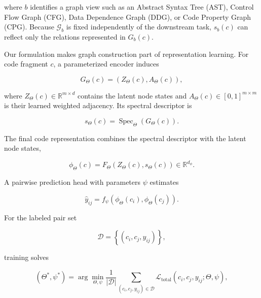 \documentclass[authoryear,final,5p,times,twocolumn]{elsarticle}
\theoremstyle{plain}
\begin{document}
where $b$ identifies a graph view such as an Abstract Syntax Tree (AST),
Control Flow Graph (CFG), Data Dependence Graph (DDG), or Code Property Graph
(CPG). Because $\mathcal{G}_{b}$ is fixed independently of the downstream
task, $s_b(c)$ can reflect only the relations represented in $G_b(c)$.

Our formulation makes graph construction part of representation learning.
For code fragment $c$, a parameterized encoder induces

\begin{equation}
\label{eq:learned_graph}
G_{\Theta}(c)
=
\left(
    Z_{\Theta}(c),
    A_{\Theta}(c)
\right),
\end{equation}

where $Z_{\Theta}(c)\in\mathbb{R}^{m\times d}$ contains the latent node states
and $A_{\Theta}(c)\in[0,1]^{m\times m}$ is their learned weighted adjacency.
Its spectral descriptor is

\begin{equation}
\label{eq:learned_spectrum}
s_{\Theta}(c)
=
\operatorname{Spec}_{\Theta}
\left(
    G_{\Theta}(c)
\right).
\end{equation}

The final code representation combines the spectral descriptor with the
latent node states,

\begin{equation}
\label{eq:learned_mapping}
\phi_{\Theta}(c)
=
F_{\Theta}
\left(
    Z_{\Theta}(c),
    s_{\Theta}(c)
\right)
\in
\mathbb{R}^{d_{\phi}}.
\end{equation}

A pairwise prediction head with parameters $\psi$ estimates

\begin{equation}
\label{eq:clone_probability_general}
\hat{y}_{ij}
=
f_{\psi}
\left(
    \phi_{\Theta}(c_i),
    \phi_{\Theta}(c_j)
\right).
\end{equation}

For the labeled pair set

\begin{equation}
\mathcal{D}
=
\left\{
    (c_i,c_j,y_{ij})
\right\},
\end{equation}

training solves

\begin{equation}
\label{eq:central_objective}
(\Theta^{*},\psi^{*})
=
\arg\min_{\Theta,\psi}
\frac{1}{|\mathcal{D}|}
\sum_{(c_i,c_j,y_{ij})\in\mathcal{D}}
\mathcal{L}_{\mathrm{total}}
\left(
    c_i,c_j,y_{ij};
    \Theta,\psi
\right),
\end{equation}
\end{document}
